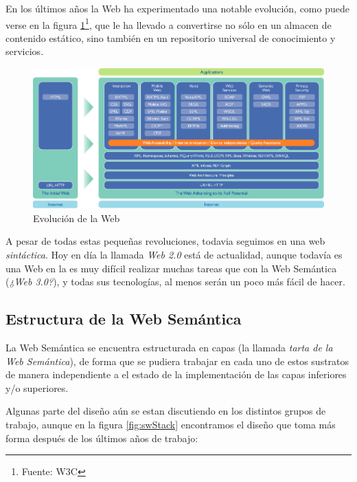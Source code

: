 En los últimos años la Web ha experimentado una notable evolución, como puede 
verse en la figura \ref{fig:evoWeb}\footnote{Fuente: W3C}, que le ha llevado a 
convertirse no sólo en un almacen de contenido estático, sino también en un 
repositorio universal de conocimiento y servicios.

\begin{figure}[ht]
	\centering
	\includegraphics[width=15cm]{images/web-evolution.png}
	\caption{Evolución de la Web}
	\label{fig:evoWeb}
\end{figure}

A pesar de todas estas pequeñas revoluciones, todavia seguimos en una web 
\emph{sintáctica}. Hoy en día la llamada \emph{Web 2.0}\cite{O'Reilly2005} está
de actualidad, aunque todavía es una Web en la es muy difícil realizar muchas 
tareas que con la Web Semántica (\emph{¿Web 3.0?}), y todas sus tecnologías, 
al menos serán un poco más fácil de hacer.

\subsection{Estructura de la Web Semántica}

La Web Semántica se encuentra estructurada en capas (la llamada \emph{tarta de 
la Web Semántica}), de forma que se pudiera trabajar en cada uno de estos
sustratos de manera independiente a el estado de la implementación de las
capas inferiores y/o superiores.

Algunas parte del diseño aún se estan discutiendo en los distintos grupos de
trabajo, aunque en la figura \ref{fig:swStack} encontramos el diseño que toma
más forma después de los últimos años de trabajo:

